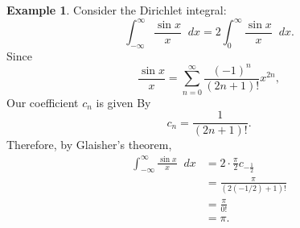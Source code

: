 \documentclass[a4paper]{article}
\newcommand*\diff{\mathop{}\!d} %
\theoremstyle{definition}
\newtheorem{example}[theorem]{Example}
\begin{document}
\begin{example}
    Consider the Dirichlet integral:
    \begin{equation*}
        \int_{-\infty}^{\infty} \frac{\sin x}{x} \diff x = 2 \int_0^{\infty} \frac{\sin x}{x} \diff x.
    \end{equation*}
    Since
    \begin{equation*}
        \frac{\sin x}{x} = \sum_{n=0}^\infty \frac{(-1)^n}{(2n+1)!} x^{2n},
    \end{equation*}
    Our coefficient $c_n$ is given By
    \begin{equation*}
        c_n = \frac{1}{(2n+1)!}.
    \end{equation*}
    Therefore, by Glaisher's theorem,
    \begin{align*}
        \int_{-\infty}^{\infty} \frac{\sin x}{x} \diff x & = 2 \cdot \frac{\pi}{2} c_{-\frac{1}{2}} \\
                                                         & = \frac{\pi}{(2(-1/2)+1)!}               \\
                                                         & = \frac{\pi}{0!}                         \\
                                                         & = \pi.
    \end{align*}
\end{example}
\end{document}
